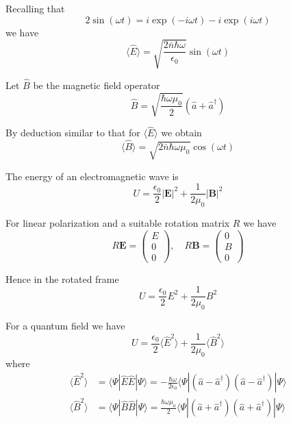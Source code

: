 \documentclass[12pt]{article}
\begin{document}
Recalling that
\begin{equation*}
2\sin(\omega t)=i\exp(-i\omega t)-i\exp(i\omega t)
\end{equation*}
we have
\begin{equation*}
\langle\hat E\rangle=\sqrt{\frac{2\bar n\hbar\omega}{\epsilon_0}}\sin(\omega t)
\end{equation*}

Let $\hat B$ be the magnetic field operator
\begin{equation*}
\hat B=\sqrt{\frac{\hbar\omega\mu_0}{2}}
(\hat a+\hat a^\dag)
\end{equation*}

By deduction similar to that for $\langle\hat E\rangle$ we obtain
\begin{equation*}
\langle\hat B\rangle=\sqrt{2\bar n\hbar\omega\mu_0}\cos(\omega t)
\end{equation*}

The energy of an electromagnetic wave is
\begin{equation*}
U=\frac{\epsilon_0}{2}|\mathbf E|^2+\frac{1}{2\mu_0}|\mathbf B|^2
\end{equation*}

For linear polarization and a suitable rotation matrix $R$ we have
\begin{equation*}
R\mathbf E=\begin{pmatrix}E\\0\\0\end{pmatrix},
\quad
R\mathbf B=\begin{pmatrix}0\\B\\0\end{pmatrix}
\end{equation*}

Hence in the rotated frame
\begin{equation*}
U=\frac{\epsilon_0}{2}E^2+\frac{1}{2\mu_0}B^2
\end{equation*}

For a quantum field we have
\begin{equation*}
U=\frac{\epsilon_0}{2}\langle\hat E^2\rangle+\frac{1}{2\mu_0}\langle\hat B^2\rangle
\end{equation*}
where
\begin{align*}
\langle\hat E^2\rangle
&=\langle\Psi|\hat E\hat E|\Psi\rangle
=-\frac{\hbar\omega}{2\epsilon_0}
\langle\Psi|(\hat a-\hat a^\dag)(\hat a-\hat a^\dag)|\Psi\rangle
\\
\langle\hat B^2\rangle
&=\langle\Psi|\hat B\hat B|\Psi\rangle
=\frac{\hbar\omega\mu_0}{2}
\langle\Psi|(\hat a+\hat a^\dag)(\hat a+\hat a^\dag)|\Psi\rangle
\end{align*}
\end{document}
